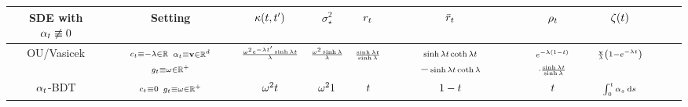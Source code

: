 \begin{landscape}
\begin{table}[h]
\begin{small}
\begin{tabular}{ccccccccccr}
\midrule
\makecell{\acrshort{SDE} with\\$\shift\not\equiv 0$} & Setting  & $\kernel$ & $\sigma^2_\star$  & $\ratio$ & $\ratioc$ & $\efftr$ & $\tshift$ \\
\midrule
\acrshort{OU}/Vasicek   & \makecell{$\scriptstyle\drift \equiv -\dconst\in\R$\\$\scriptstyle\shift \equiv \sconst\in\R^{\vdim}$\\$\scriptstyle\volat \equiv \vconst \in \R^+$}  & $\scriptstyle\frac{\vconst^2e^{-\dconst \ctime'} \sinh \dconst\ctime}{\dconst} $ & $\scriptstyle\frac{\vconst^2\sinh\dconst}{\dconst}$ & $\scriptstyle\frac{\sinh\dconst\ctime}{\sinh\dconst}$ & \makecell{$\scriptstyle\sinh\dconst\ctime\coth\dconst\ctime$\\$-\scriptstyle\sinh\dconst\ctime\coth\dconst$} & \makecell{$\scriptstyle e^{-\dconst(\horizon-\ctime)}$\\$\scriptstyle\cdot\frac{\sinh\dconst\ctime}{\sinh\dconst}$} & $\scriptstyle\frac{\sconst}{\dconst}\parens*{1-e^{-\dconst\ctime}} $  \\
$\shift$-\acrshort{BDT}   & \makecell{$\scriptstyle\drift \equiv 0$\\$\scriptstyle\volat \equiv \vconst \in \R^+$}  & $\vconst^2\ctime$ & $\vconst^2\horizon$ & ${\ctime}$ & $1- {\ctime}$ & ${\ctime}$ & $\scriptstyle\int_0^\ctime \shift[\ctimealt]\dd \ctimealt$  \\
\bottomrule
\end{tabular}
\end{small}
\end{table}
\end{landscape}
\newpage

